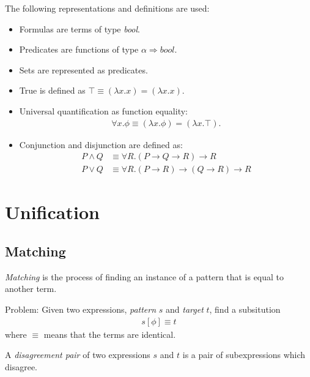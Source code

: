 \documentclass{article}
\begin{document}
\begin{definition}
	The following representations and definitions are used:
	\begin{itemize}
		\item Formulas are terms of type \textit{bool}.
		\item Predicates are functions of type $\alpha\Rightarrow\textit{bool}$.
		\item Sets are represented as predicates.
		\item True is defined as $\top \equiv (\lambda x.x)=(\lambda x.x)$.
		\item Universal quantification as function equality: \begin{align*}
			      \forall x. \phi \equiv (\lambda x. \phi) = (\lambda x. \top).
		      \end{align*}
		\item Conjunction and disjunction are defined as: \begin{align*}
			      P\wedge Q & \equiv \forall R. (P\rightarrow Q \rightarrow R) \rightarrow R               \\
			      P\vee Q   & \equiv \forall R. (P\rightarrow R)\rightarrow (Q\rightarrow R) \rightarrow R
		      \end{align*}
	\end{itemize}
\end{definition}

\section{Unification}

\subsection{Matching}

\begin{definition}
	\emph{Matching} is the process of finding an instance of a pattern that is equal to another term.

	Problem: Given two expressions, \emph{pattern} $s$ and \emph{target} $t$, find a subsitution
	\begin{align*}
		s[\phi] \equiv t
	\end{align*}
	where $\equiv$ means that the terms are identical.
\end{definition}

\begin{definition}
	A \emph{disagreement pair} of two expressions $s$ and $t$ is a pair of subexpressions
	which disagree.
\end{definition}
\end{document}
